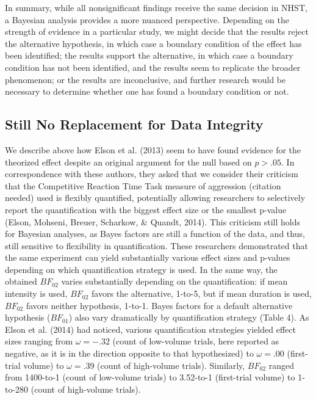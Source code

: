 \documentclass[fignum,nobf,man]{apa}
\begin{document}
In summary, while all nonsignificant findings receive the same decision in NHST, a Bayesian analysis provides a more nuanced perspective. Depending on the strength of evidence in a particular study, we might decide that the results reject the alternative hypothesis, in which case a boundary condition of the effect has been identified; the results support the alternative, in which case a boundary condition has not been identified, and the results seem to replicate the broader phenomenon; or the results are inconclusive, and further research would be necessary to determine whether one has found a boundary condition or not.

\subsection{Still No Replacement for Data Integrity} %
We describe above how Elson et al. (2013) seem to have found evidence for the theorized effect despite an original argument for the null based on $p > .05$. In correspondence with these authors, they asked that we consider their criticism that the Competitive Reaction Time Task measure of aggression (citation needed) used is flexibly quantified, potentially allowing researchers to selectively report the quantification with the biggest effect size or the smallest p-value (Elson, Mohseni, Breuer, Scharkow, \& Quandt, 2014). This criticism still holds for Bayesian analyses, as Bayes factors are still a function of the data, and thus, still sensitive to flexibility in quantification. These researchers demonstrated that the same experiment can yield substantially various effect sizes and p-values depending on which quantification strategy is used. In the same way, the obtained $BF_{02}$ varies substantially depending on the quantification: if mean intensity is used, $BF_{02}$ favors the alternative, 1-to-5, but if mean duration is used, $BF_{02}$ favors neither hypothesis, 1-to-1. Bayes factors for a default alternative hypothesis ($BF_{01}$) also vary dramatically by quantification strategy (Table 4). As Elson et al. (2014) had noticed, various quantification strategies yielded effect sizes ranging from $\omega = -.32$ (count of low-volume trials, here reported as negative, as it is in the direction opposite to that hypothesized) to $\omega = .00$ (first-trial volume) to $\omega = .39$ (count of high-volume trials). Similarly, $BF_{02}$ ranged from 1400-to-1 (count of low-volume trials) to 3.52-to-1 (first-trial volume) to 1-to-280 (count of high-volume trials).
\end{document}
